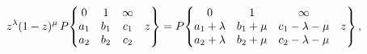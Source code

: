 \[z^{\lambda}(1-z)^{\mu}\mathop{P\/}\nolimits\!\begin{Bmatrix}0&1&\infty&\\
a_{1}&b_{1}&c_{1}&z\\
a_{2}&b_{2}&c_{2}&\end{Bmatrix}=\mathop{P\/}\nolimits\!\begin{Bmatrix}0&1&%
\infty&\\
a_{1}+\lambda&b_{1}+\mu&c_{1}-\lambda-\mu&z\\
a_{2}+\lambda&b_{2}+\mu&c_{2}-\lambda-\mu&\end{Bmatrix},\]